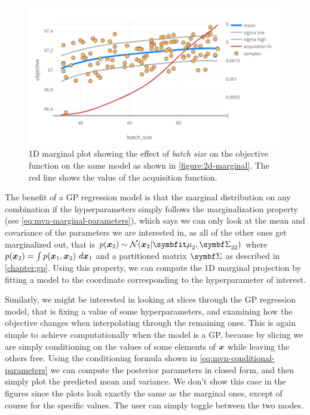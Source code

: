 \begin{figure}
	\begin{center}
		\includegraphics[width=1.0\textwidth]{images/1d-marginal.png}
		\caption{1D marginal plot showing the effect of \emph{batch size} on the objective function on the same model as shown in \autoref{figure:2d-marginal}. The red line shows the value of the acquisition function.}
	\end{center}
\end{figure}
\label{figure:1d-marginal}

The benefit of a GP regression model is that the marginal distribution on any combination if the hyperparameters simply follows the marginalization property (see \autoref{eq:mvn-marginal-parameters}), which says we can only look at the mean and covariance of the parameters we are interested in, as all of the other ones get marginalized out, that is $p(\vx_2) \sim \mathcal{N}(\vx_2 | \vmu_2, \mSigma_{22})$ where $p({\boldsymbol{x}}_2) = \int p({\boldsymbol{x}}_1, {\boldsymbol{x}}_2)\ d{\boldsymbol{x}}_1$ and a partitioned matrix $\mSigma$ as described in \autoref{chapter:gp}. Using this property, we can compute the 1D marginal projection by fitting a model to the coordinate corresponding to the hyperparameter of interest.

Similarly, we might be interested in looking at slices through the GP regression model, that is fixing a value of some hyperparameters, and examining how the objective changes when interpolating through the remaining ones. This is again simple to achieve computationally when the model is a GP, because by slicing we are simply conditioning on the values of some elements of ${\boldsymbol{x}}$ while leaving the others free. Using the conditioning formula shown in \autoref{eq:mvn-conditional-parameters} we can compute the posterior parameters in closed form, and then simply plot the predicted mean and variance. We don't show this case in the figures since the plots look exactly the same as the marginal ones, except of course for the specific values. The user can simply toggle between the two modes.

